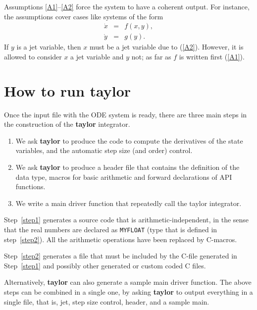 \documentclass[10pt]{article}
\theoremstyle{remark}
\newcommand{\taylorname}{{\bf taylor}}
\newcommand{\myfloat}{{\tt MY\symbol{95}FLOAT}}
\begin{document}
Assumptions \ref{A1}--\ref{A2} force the system to have a coherent
output. For instance, the assumptions cover cases like systems of the
form
\begin{eqnarray*}
    \dot x &=& f(x,y), \\
    \dot y &=& g(y).
\end{eqnarray*}
If $y$ is a jet variable, then $x$ must be a jet variable due to
(\ref{A2}). However, it is allowed to consider $x$ a jet variable and
$y$ not; as far as $f$ is written first (\ref{A1}).

\section{How to run \taylorname{}}

Once the input file with the ODE system is ready, there are three main
steps in the construction of the \taylorname{} integrator.

\begin{enumerate}
\renewcommand{\theenumi}{\arabic{enumi}}
\renewcommand{\labelenumi}{\theenumi.)}
    \item\label{step1} We ask \taylorname{} to produce the code to
      compute the derivatives of the state variables, and the
      automatic step size (and order) control.
    \item\label{step2} We ask \taylorname{} to produce a header file
      that contains the definition of the data type, macros for basic arithmetic and forward declarations of
       API functions.
    \item\label{step3} We write a main driver function that repeatedly
      call the taylor integrator.
\end{enumerate}
Step~\ref{step1} generates a source code that is
arithmetic-independent, in the sense that the real numbers are
declared as \myfloat{} (type that is defined in step~\ref{step2}). All
the arithmetic operations have been replaced by C-macros. 

\smallskip

Step~\ref{step2} generates a file that must be included by the C-file
generated in Step~\ref{step1} and possibly other generated or custom
coded C files.

\medskip

Alternatively, \taylorname{} can also generate a sample main driver
function.  The above steps can be combined in a single one, by asking
\taylorname{} to output everything in a single file, that is, jet,
step size control, header, and a sample main.
\end{document}

